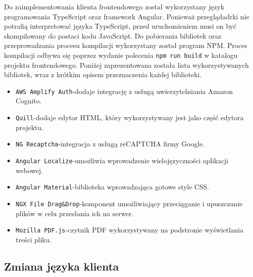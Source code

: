 Do zaimplementowania klienta frontendowego został wykorzystany język programowania TypeScript oraz framework Angular. Ponieważ przeglądadrki nie potrafią interpretować języka TypeScript, przed uruchomieniem musi on być skompilowany do postaci kodu JavaScript. Do pobierania bibliotek oraz przeprowadzania procesu kompilacji wykorzystany został program NPM. Proces kompilacji odbywa się poprzez wydanie polecenia \texttt{npm run build} w katalogu projektu frontendowego. Poniżej zaprezentowana została lista wykorzystywanych bibliotek, wraz z krótkim opisem przeznaczenia każdej biblioteki.

\begin{itemize}
    \item \verb|AWS Amplify Auth|\hspace{0.6em}-\hspace{0.6em}dodaje integrację z usługą uwierzytelniania Amazon Cognito.
    \item \verb|Quill|\hspace{0.6em}-\hspace{0.6em}dodaje edytor HTML, który wykorzystywany jest jako część edytora projektu.
    \item \verb|NG Recaptcha|\hspace{0.6em}-\hspace{0.6em}integracja z usługą reCAPTCHA firmy Google.
    \item \verb|Angular Localize|\hspace{0.6em}-\hspace{0.6em}umożliwia wprowadzenie wielojęzyczności aplikacji webowej.
    \item \verb|Angular Material|\hspace{0.6em}-\hspace{0.6em}biblioteka wprowadzająca gotowe style CSS.
    \item \verb|NGX File Drag&Drop|\hspace{0.6em}-\hspace{0.6em}komponent umożliwiający przeciąganie i upuszczanie plików w celu przesłania ich na serwer.
    \item \verb|Mozilla PDF.js|\hspace{0.6em}-\hspace{0.6em}czytnik PDF wykorzystywany na podstronie wyświetlania treści pliku.
\end{itemize}

\subsection{Zmiana języka klienta}

